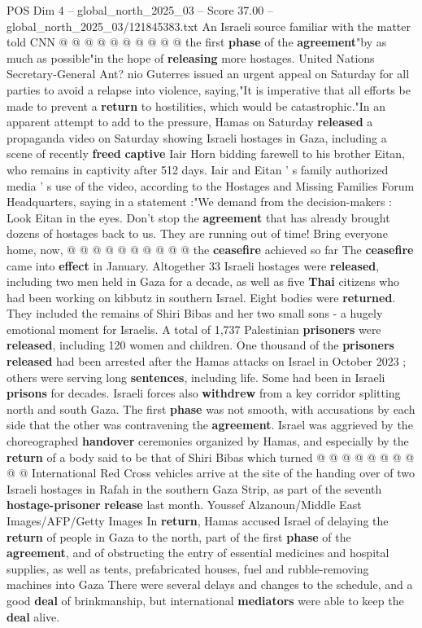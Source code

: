\begin{textsample}{POS Dim 4 – global\_north\_2025\_03 – Score 37.00 – global\_north\_2025\_03/121845383.txt}
An Israeli source familiar with the matter told CNN @ @ @ @ @ @ @ @ @ @ the first \textbf{phase} of the \textbf{agreement}"by as much as possible"in the hope of \textbf{releasing} more hostages.
United Nations Secretary-General Ant? nio Guterres issued an urgent appeal on Saturday for all parties to avoid a relapse into violence, saying,"It is imperative that all efforts be made to prevent a \textbf{return} to hostilities, which would be catastrophic."In an apparent attempt to add to the pressure, Hamas on Saturday \textbf{released} a propaganda video on Saturday showing Israeli hostages in Gaza, including a scene of recently \textbf{freed} \textbf{captive} Iair Horn bidding farewell to his brother Eitan, who remains in captivity after 512 days.
Iair and Eitan ' s family authorized media ' s use of the video, according to the Hostages and Missing Families Forum Headquarters, saying in a statement :"We demand from the decision-makers : Look Eitan in the eyes.
Don't stop the \textbf{agreement} that has already brought dozens of hostages back to us.
They are running out of time!
Bring everyone home, now, @ @ @ @ @ @ @ @ @ @ the \textbf{ceasefire} achieved so far The \textbf{ceasefire} came into \textbf{effect} in January.
Altogether 33 Israeli hostages were \textbf{released}, including two men held in Gaza for a decade, as well as five \textbf{Thai} citizens who had been working on kibbutz in southern Israel.
Eight bodies were \textbf{returned}.
They included the remains of Shiri Bibas and her two small sons - a hugely emotional moment for Israelis.
A total of 1,737 Palestinian \textbf{prisoners} were \textbf{released}, including 120 women and children.
One thousand of the \textbf{prisoners} \textbf{released} had been arrested after the Hamas attacks on Israel in October 2023 ; others were serving long \textbf{sentences}, including life.
Some had been in Israeli \textbf{prisons} for decades.
Israeli forces also \textbf{withdrew} from a key corridor splitting north and south Gaza.
The first \textbf{phase} was not smooth, with accusations by each side that the other was contravening the \textbf{agreement}.
Israel was aggrieved by the choreographed \textbf{handover} ceremonies organized by Hamas, and especially by the \textbf{return} of a body said to be that of Shiri Bibas which turned @ @ @ @ @ @ @ @ @ @ International Red Cross vehicles arrive at the site of the handing over of two Israeli hostages in Rafah in the southern Gaza Strip, as part of the seventh \textbf{hostage-prisoner} \textbf{release} last month.
Youssef Alzanoun/Middle East Images/AFP/Getty Images In \textbf{return}, Hamas accused Israel of delaying the \textbf{return} of people in Gaza to the north, part of the first \textbf{phase} of the \textbf{agreement}, and of obstructing the entry of essential medicines and hospital supplies, as well as tents, prefabricated houses, fuel and rubble-removing machines into Gaza There were several delays and changes to the schedule, and a good \textbf{deal} of brinkmanship, but international \textbf{mediators} were able to keep the \textbf{deal} alive.

\end{textsample}
